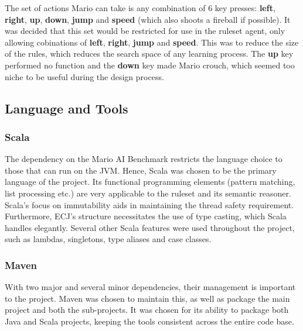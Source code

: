 The set of actions Mario can take is any combination of 6 key presses: \textbf{left}, \textbf{right}, \textbf{up}, \textbf{down}, \textbf{jump} and \textbf{speed} (which also shoots a fireball if possible). It was decided that this set would be restricted for use in the ruleset agent, only allowing cobinations of \textbf{left}, \textbf{right}, \textbf{jump} and \textbf{speed}. This was to reduce the size of the rules, which reduces the search space of any learning process. The \textbf{up} key performed no function and the \textbf{down} key made Mario crouch, which seemed too niche to be useful during the design process.



\subsection{Language and Tools}

\subsubsection{Scala}
\label{subsec:langchoice}
The dependency on the Mario AI Benchmark restricts the language choice to those that can run on the JVM. Hence, Scala was chosen to be the primary language of the project. Its functional programming elements (pattern matching, list processing etc.) are very applicable to the ruleset and its semantic reasoner. Scala's focus on immutability aids in maintaining the thread safety requirement. Furthermore, ECJ's structure necessitates the use of type casting, which Scala handles elegantly. Several other Scala features were used throughout the project, such as lambdas, singletons, type aliases and case classes. 

\subsubsection{Maven}
With two major and several minor dependencies, their management is important to the project. Maven was chosen to maintain this, as well as package the main project and both the sub-projects. It was chosen for its ability to package both Java and Scala projects, keeping the tools consistent across the entire code base.



